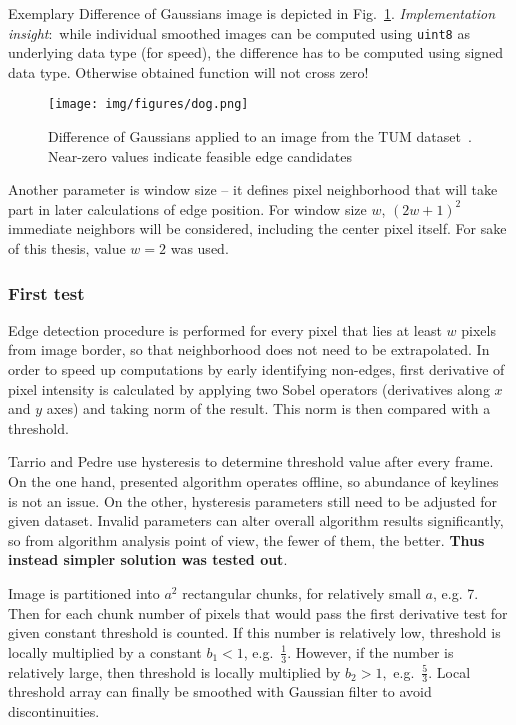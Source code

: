 Exemplary Difference of Gaussians image is depicted in Fig.~\ref{fig:dog}. \textit{Implementation insight}:~while individual smoothed images can be computed using {\tt uint8} as underlying data type (for speed), the difference has to be computed using signed data type. Otherwise obtained function will not cross zero!

\begin{figure}[ht]
	\centering\texttt{[image: img/figures/dog.png]}
	\caption{ Difference of Gaussians applied to an image from the TUM dataset~\cite{tum}. Near-zero values indicate feasible edge candidates }
	\label{fig:dog}
\end{figure}

Another parameter is window size -- it defines pixel neighborhood that will take part in later calculations of edge position. For window size $w$, $(2w+1)^2$ immediate neighbors will be considered, including the center pixel itself. For sake of this thesis, value $w = 2$ was used.

\subsubsection*{First test}
\label{edge_first}

Edge detection procedure is performed for every pixel that lies at least $w$ pixels from image border, so that neighborhood does not need to be extrapolated. In order to speed up computations by early identifying non-edges, first derivative of pixel intensity is calculated by applying two Sobel operators (derivatives along $x$ and $y$ axes) and taking norm of the result. This norm is then compared with a threshold. 

Tarrio and Pedre use hysteresis to determine threshold value after every frame. On the one hand, presented algorithm operates offline, so abundance of keylines is not an issue. On the other, hysteresis parameters still need to be adjusted for given dataset. Invalid parameters can alter overall algorithm results significantly, so from algorithm analysis point of view, the fewer of them, the better. \textbf{Thus instead simpler solution was tested out}.

Image is partitioned into $a^2$ rectangular chunks, for relatively small $a$, e.g. 7. Then for each chunk number of pixels that would pass the first derivative test for given constant threshold is counted. If this number is relatively low, threshold is locally multiplied by a constant ${b_{1} < 1}$, e.g.~$\frac{1}{3}$. However, if the number is relatively large, then threshold is locally multiplied by ${b_{2} > 1}$,~e.g.~$\frac{5}{3}$. Local threshold array can finally be smoothed with Gaussian filter to avoid discontinuities.

